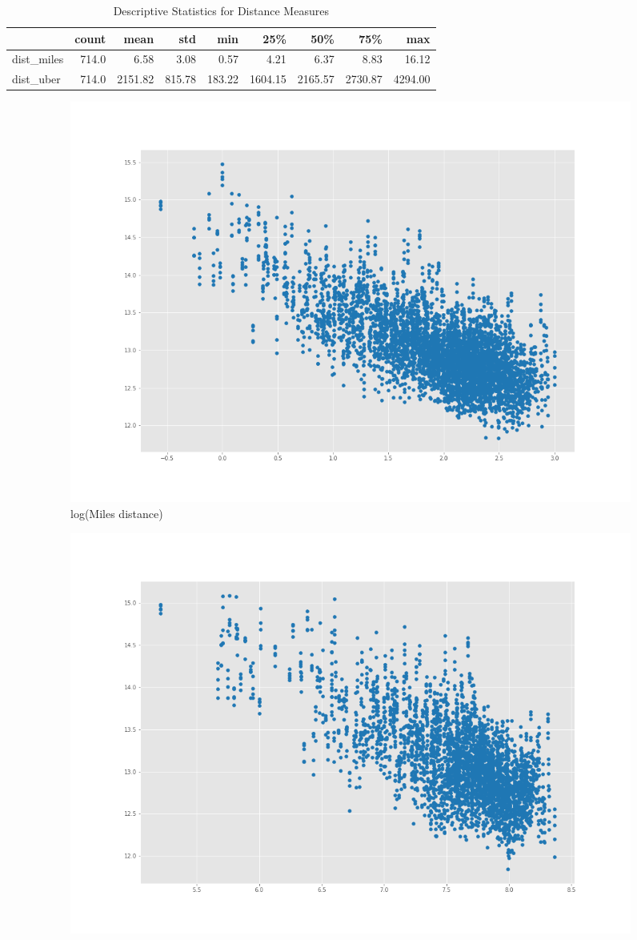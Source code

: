 \documentclass{article}
\begin{document}
\begin{table}[H]
\centering
\caption{Descriptive Statistics for Distance Measures} 
  \label{table:distance} 
\begin{tabular}{lrrrrrrrr}
\toprule
{} &  count &     mean &     std &     min &      25\% &      50\% &      75\% &      max \\
\midrule
dist\_miles     &  714.0 &     6.58 &    3.08 &    0.57 &     4.21 &     6.37 &     8.83 &    16.12 \\
dist\_uber &  714.0 &  2151.82 &  815.78 &  183.22 &  1604.15 &  2165.57 &  2730.87 &  4294.00 \\
\bottomrule
\end{tabular}
\end{table}

\begin{figure}[H]
  \begin{subfigure}{.5\textwidth}
      \centering
      \includegraphics[width=\linewidth]{images/scatter_miles.png}
      \caption{log(Miles distance)}
      \label{fig:3(a)}
  \end{subfigure}
  \begin{subfigure}{.5\textwidth}
      \centering
      \includegraphics[width=\linewidth]{images/scatter_uber.png}

\end{subfigure}
\end{figure}
\end{document}

